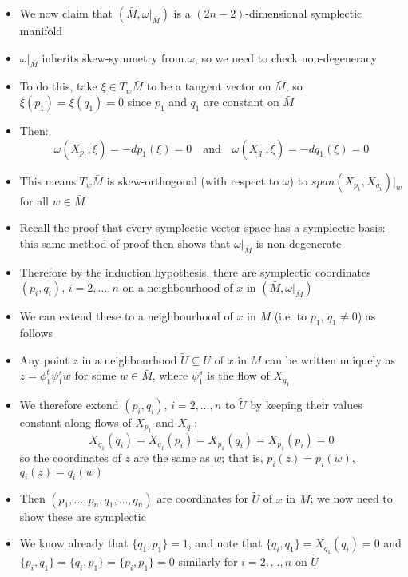 \documentclass[12pt,a4paper]{article}
\numberwithin{equation}{section}
\begin{document}
\begin{itemize}
\begin{itemize}
			\item We now claim that $(\bar{M},\omega\rvert_{\bar{M}})$ is a $(2n-2)$-dimensional symplectic manifold
			\item $\omega\rvert_{\bar{M}}$ inherits skew-symmetry from $\omega$, so we need to check non-degeneracy
			\item To do this, take $\xi\in T_{w}\bar{M}$ to be a tangent vector on $\bar{M}$, so $\xi(p_{1})=\xi(q_{1})=0$ since $p_{1}$ and $q_{1}$ are constant on $\bar{M}$
			\item Then:
			\begin{equation}
				\omega(X_{p_{1}},\xi)=-dp_{1}(\xi)=0\quad\text{and}\quad \omega(X_{q_{1}},\xi)=-dq_{1}(\xi)=0
			\end{equation}
			\item This means $T_{w}\bar{M}$ is skew-orthogonal (with respect to $\omega$) to $span(X_{p_{1}},X_{q_{1}})\rvert_{w}$ for all $w\in \bar{M}$
			\item Recall the proof that every symplectic vector space has a symplectic basis: this same method of proof then shows that $\omega\rvert_{\bar{M}}$ is non-degenerate
			\item Therefore by the induction hypothesis, there are symplectic coordinates $(p_{i},q_{i}),\,i=2,\ldots,n$ on a neighbourhood of $x$ in $(\bar{M},\omega\rvert_{\bar{M}})$
			\item We can extend these to a neighbourhood of $x$ in $M$ (i.e. to $p_{1},\,q_{1}\neq0$) as follows
			\item Any point $z$ in a neighbourhood $\tilde{U}\subseteq U$ of $x$ in $M$ can be written uniquely as $z=\phi_{1}^{t}\psi_{1}^{s}w$ for some $w\in \bar{M}$, where $\psi_{1}^{s}$ is the flow of $X_{q_{1}}$
			\item We therefore extend $(p_{i},q_{i}),\, i=2,\ldots,n$ to $\tilde{U}$ by keeping their values constant along flows of $X_{p_{1}}$ and $X_{q_{1}}$:
			\begin{equation}
				X_{q_{1}}(q_{i})=X_{q_{1}}(p_{i})=X_{p_{1}}(q_{i})=X_{p_{1}}(p_{i})=0
			\end{equation}
			so the coordinates of $z$ are the same as $w$; that is, $p_{i}(z)=p_{i}(w)$, $q_{i}(z)=q_{i}(w)$
			\item Then $(p_{1},\ldots,p_{n},q_{1},\ldots,q_{n})$ are coordinates for $\tilde{U}$ of $x$ in $M$; we now need to show these are symplectic
			\item We know already that $\{q_{1},p_{1}\}=1$, and note that $\{q_{i},q_{1}\}=X_{q_{1}}(q_{i})=0$ and $\{p_{i},q_{1}\}=\{q_{i},p_{1}\}=\{p_{i},p_{1}\}=0$ similarly for $i=2,\ldots,n$ on $\tilde{U}$

\end{itemize}
\end{itemize}
\end{document}

